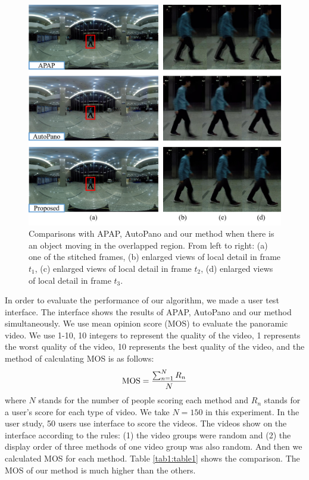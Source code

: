 \documentclass[conference]{IEEEtran}
\begin{document}
\begin{figure}[!htpb]
\centering
\includegraphics[scale=0.36]{picture36.png}
\caption{Comparisons with APAP, AutoPano and our method when there is an object moving in the overlapped region. From left to right: (a) one of the stitched frames, (b) enlarged views of local
detail in frame $t_1$, (c) enlarged views of local detail in frame $t_2$, (d) enlarged views of local detail in frame $t_3$.}
\label{fig:pic15}
\end{figure}

In order to evaluate the performance of our algorithm, we made a user test interface. The interface shows the results of APAP, AutoPano and our method simultaneously.
We use mean opinion score (MOS) to evaluate the panoramic video. We use 1-10, 10 integers to represent the quality of the video, 
1 represents the worst quality of the video, 10 represents the best quality of the video, and the method of calculating MOS is as follows:
\begin{equation}
{\rm MOS}=\frac{\sum^{N}_{n=1}{R_n}}{N}
\end{equation}
where $N$ stands for the number of people scoring each method and $R_n$ stands for a user's score for each type of video. We take $N=150$ in this experiment.
In the user study, 50 users use interface to score the videos. The videos show on the interface according to the rules: (1) the video groups were random and 
(2) the display order of three methods of one video group was also random.
And then we calculated MOS for each method. Table \ref{tab1:table1} shows the comparison. The MOS of our method is much higher than the others.
\end{document}

